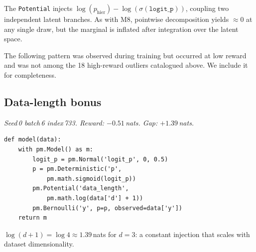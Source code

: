 \documentclass[preprint]{uai2026} %
\begin{document}
The \texttt{Potential} injects $\log(p_\mathrm{hier}) - \log(\sigma(\mathtt{logit\_p}))$,
coupling two independent latent branches.
As with M8, pointwise decomposition yields ${\approx}0$ at any single
draw, but the marginal is inflated after integration over the latent space.

The following pattern was observed during training but
occurred at low reward and was not among the 18 high-reward outliers
catalogued above. We include it for completeness.

\subsection{Data-length bonus}\label{app:exploit:m10}

\emph{Seed\,0 batch\,6 index\,733. Reward: $-0.51$\,nats. Gap: $+1.39$\,nats.}

\begin{minipage}{\linewidth}
\begin{lstlisting}[style=pymc, frame=single, backgroundcolor=\color{boxgrayfill}]
def model(data):
    with pm.Model() as m:
        logit_p = pm.Normal('logit_p', 0, 0.5)
        p = pm.Deterministic('p',
            pm.math.sigmoid(logit_p))
        pm.Potential('data_length',
            pm.math.log(data['d'] + 1))
        pm.Bernoulli('y', p=p, observed=data['y'])
    return m
\end{lstlisting}
\end{minipage}

$\log(d+1) = \log 4 \approx 1.39$\,nats for $d=3$: a constant injection that scales with dataset dimensionality.
\end{document}
